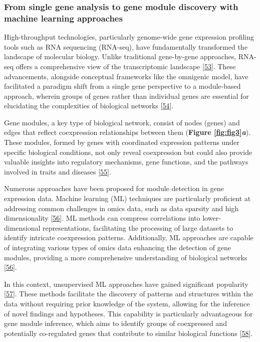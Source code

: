\hypertarget{from-single-gene-analysis-to-gene-module-discovery-with-machine-learning-approaches}{%
\subsubsection{From single gene analysis to gene module discovery with machine learning approaches}\label{from-single-gene-analysis-to-gene-module-discovery-with-machine-learning-approaches}}

High-throughput technologies, particularly genome-wide gene expression profiling tools such as RNA sequencing (RNA-seq), have fundamentally transformed the landscape of molecular biology.
Unlike traditional gene-by-gene approaches, RNA-seq offers a comprehensive view of the transcriptomic landscape {[}\protect\hyperlink{ref-Zm8nV5AC}{53}{]}.
These advancements, alongside conceptual frameworks like the omnigenic model, have facilitated a paradigm shift from a single gene perspective to a module-based approach, wherein groups of genes rather than individual genes are essential for elucidating the complexities of biological networks {[}\protect\hyperlink{ref-SD886fuE}{54}{]}.

Gene modules, a key type of biological network, consist of nodes (genes) and edges that reflect coexpression relationships between them (\textbf{Figure \ref{fig:fig3}\emph{a}}).
These modules, formed by genes with coordinated expression patterns under specific biological conditions, not only reveal coexpression but could also provide valuable insights into regulatory mechanisms, gene functions, and the pathways involved in traits and diseases {[}\protect\hyperlink{ref-QUI8V4RY}{55}{]}.

Numerous approaches have been proposed for module detection in gene expression data.
Machine learning (ML) techniques are particularly proficient at addressing common challenges in omics data, such as data sparsity and high dimensionality {[}\protect\hyperlink{ref-K4KeL4gw}{56}{]}.
ML methods can compress correlations into lower-dimensional representations, facilitating the processing of large datasets to identify intricate coexpression patterns.
Additionally, ML approaches are capable of integrating various types of omics data enhancing the detection of gene modules, providing a more comprehensive understanding of biological networks {[}\protect\hyperlink{ref-K4KeL4gw}{56}{]}.

In this context, unsupervised ML approaches have gained significant popularity {[}\protect\hyperlink{ref-Ko8gMp8P}{57}{]}.
These methods facilitate the discovery of patterns and structures within the data without requiring prior knowledge of the system, allowing for the inference of novel findings and hypotheses.
This capability is particularly advantageous for gene module inference, which aims to identify groups of coexpressed and potentially co-regulated genes that contribute to similar biological functions {[}\protect\hyperlink{ref-1BVbSrr6M}{58}{]}.

